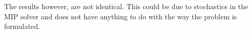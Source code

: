 \documentclass[
10pt, %
letter, %
oneside, %
BCOR02mm, %
]{scrartcl}
\begin{document}
The results however, are not identical. This could be due to stochastics in the MIP solver and does not have anything to do with the way the problem is formulated. 

\renewcommand{\refname}{\spacedlowsmallcaps{References}} %




\end{document}
